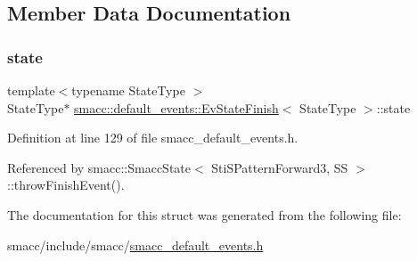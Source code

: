\subsection{Member Data Documentation}
\mbox{\label{structsmacc_1_1default__events_1_1EvStateFinish_ad598cccf2b8ddb507f3c0efba2232d62}} 
\subsubsection{\texorpdfstring{state}{state}}
{\footnotesize\ttfamily template$<$typename State\+Type $>$ \\
State\+Type$\ast$ \hyperlink{structsmacc_1_1default__events_1_1EvStateFinish}{smacc\+::default\+\_\+events\+::\+Ev\+State\+Finish}$<$ State\+Type $>$\+::state}



Definition at line 129 of file smacc\+\_\+default\+\_\+events.\+h.



Referenced by smacc\+::\+Smacc\+State$<$ Sti\+S\+Pattern\+Forward3, S\+S $>$\+::throw\+Finish\+Event().



The documentation for this struct was generated from the following file\+:\begin{DoxyCompactItemize}
\item 
smacc/include/smacc/\hyperlink{smacc__default__events_8h}{smacc\+\_\+default\+\_\+events.\+h}\end{DoxyCompactItemize}
